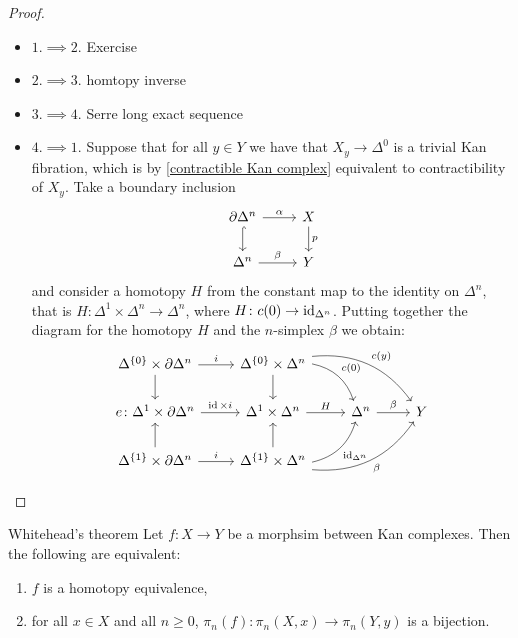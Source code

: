 \begin{proof}
\leavevmode
\begin{itemize}[label={}]
    \item 
    $1. \implies 2.$ Exercise
    \item 
    $2. \implies 3.$ homtopy inverse
    \item 
    $3. \implies 4.$ Serre long exact sequence
    \item 
    $4. \implies 1.$ Suppose that for all $y \in Y$ we have that $X_y \to \Delta^0$ is a trivial Kan fibration, which is by \cref{contractible Kan complex} equivalent to contractibility of $X_y$.
    Take a boundary inclusion 
    \[
    \begin{tikzcd}
        \partial \Delta^n
        \ar[r, "\alpha"]
        \ar[d, hook]
        &
        X
        \ar[d, "p"]
        \\
        \Delta^n 
        \ar[r, "\beta"]
        &
        Y
    \end{tikzcd}
    \]
    and consider a homotopy $H$ from the constant map to the identity on $\Delta^n$, that is $H \colon \Delta^1 \times \Delta^n \to \Delta^n$, where $H\colon c(0) \to \operatorname{id}_{\Delta^n}$.
    Putting together the diagram for the homotopy $H$ and the $n$-simplex $\beta$ we obtain:
    \[
    \begin{tikzcd}
        \Delta^{\{0\}} \times \partial \Delta^n
        \ar[r, "i"]
        \ar[d]
        &
        \Delta^{\{0\}} \times \Delta^n
        \ar[d]
        \ar[rd, bend left, "c(0)"]
        \ar[rrd,bend left, "c(y)"]
        \\
        e\colon\Delta^1 \times \partial \Delta^n
        \ar[r, "\id \times i"]
        &
        \Delta^1 \times \Delta^n
        \ar[r, "H"]
        &
        \Delta^n
        \ar[r, "\beta"]
        &
        Y
        \\
        \Delta^{\{1\}} \times \partial \Delta^n
        \ar[u]
        \ar[r, "i"]
        &
        \Delta^{\{1\}} \times \Delta^n
        \ar[u]
        \ar[ru, bend right, "\id_{\Delta^n}"'] 
        \ar[rru, bend right, "\beta"']
    \end{tikzcd}
    \]
\end{itemize}
\end{proof}

\begin{thm}{Whitehead's theorem}
Let $f\colon X \to Y$ be a morphsim between Kan complexes. 
Then the following are equivalent:
    \begin{enumerate}
        \item 
        $f$ is a homotopy equivalence,
        \item 
        for all $x \in X$ and all $n \geq 0$, $\pi_n(f)\colon  \pi_n(X,x) \to \pi_n(Y,y)$ is a bijection.
    \end{enumerate}
\end{thm}


